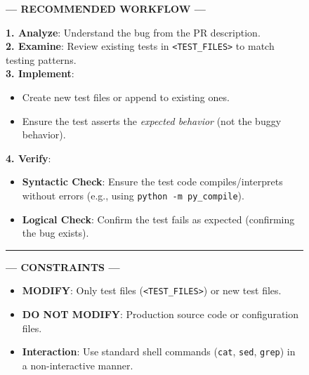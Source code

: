 \documentclass[11pt]{article}
\begin{document}
\begin{figure}[t!]
\begin{tcolorbox}
    \begin{center}
        \color{teal!80!black}\textbf{--- RECOMMENDED WORKFLOW ---}
    \end{center}
    \vspace{5pt}

    \textbf{1. Analyze}: Understand the bug from the PR description. \\
    \textbf{2. Examine}: Review existing tests in \texttt{<TEST\_FILES>} to match testing patterns. \\
    \textbf{3. Implement}: 
    \begin{itemize}[leftmargin=1.5em, nosep]
        \item Create new test files or append to existing ones.
        \item Ensure the test asserts the \textit{expected behavior} (not the buggy behavior).
    \end{itemize}
    \textbf{4. Verify}: 
    \begin{itemize}[leftmargin=1.5em, nosep]
        \item \textbf{Syntactic Check}: Ensure the test code compiles/interprets without errors (e.g., using \texttt{python -m py\_compile}).
        \item \textbf{Logical Check}: Confirm the test fails as expected (confirming the bug exists).
    \end{itemize}

    \vspace{10pt}
    \hrule
    \vspace{10pt}

    \begin{center}
        \color{orange!80!black}\textbf{--- CONSTRAINTS ---}
    \end{center}
    \vspace{5pt}

    \begin{itemize}[leftmargin=1.5em, nosep]
        \item \textbf{MODIFY}: Only test files (\texttt{<TEST\_FILES>}) or new test files.
        \item \textbf{DO NOT MODIFY}: Production source code or configuration files.
        \item \textbf{Interaction}: Use standard shell commands (\texttt{cat}, \texttt{sed}, \texttt{grep}) in a non-interactive manner.
    \end{itemize}


\end{tcolorbox}
\end{figure}
\end{document}
